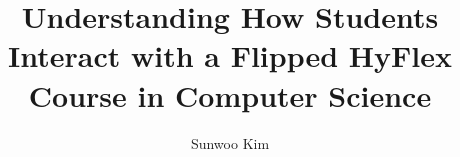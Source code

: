 %
%
%
%



\title{Understanding How Students Interact with a Flipped HyFlex Course in Computer Science}

\author{Sunwoo Kim}
\degreeyear{\the\year}






